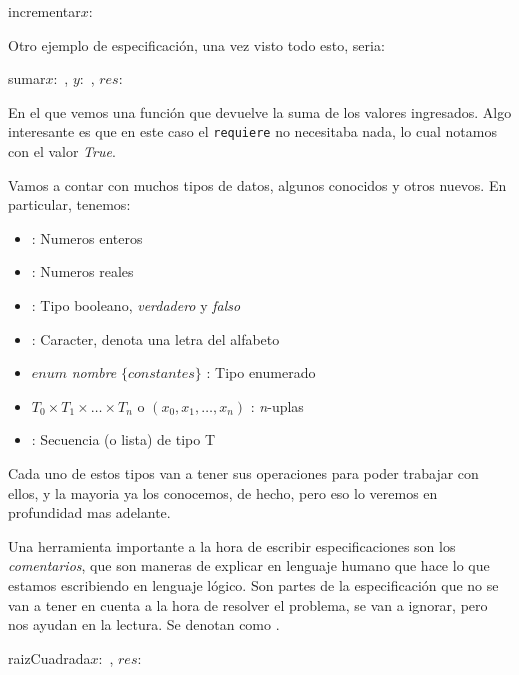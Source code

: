 \documentclass{article}
\begin{document}
\begin{proc}{incrementar}{\Inout $x:$ \ent}

	\requiere{\True}
	
\end{proc}

Otro ejemplo de especificación, una vez visto todo esto, seria:

\begin{proc}{sumar}{\In $x:$ \ent, \In $y:$ \ent, \Out $res:$ \ent}

	\requiere{\True}
	
\end{proc}

En el que vemos una función que devuelve la suma de los valores ingresados. Algo interesante es que en este caso el \texttt{requiere} no necesitaba nada, lo cual notamos con el valor \textit{True}.

Vamos a contar con muchos tipos de datos, algunos conocidos y otros nuevos. En particular, tenemos:

\begin{itemize}
	\item \ent : Numeros enteros
	\item \float : Numeros reales
	\item \bool : Tipo booleano, \textit{verdadero} y \textit{falso}
	\item \cha : Caracter, denota una letra del alfabeto
	\item $enum$ \textit{nombre} $\{ constantes \}$ : Tipo enumerado
	\item $T_{0} \times T_{1} \times \ldots \times T_{n}$ o $(x_{0}, x_{1}, \ldots , x_{n})$ : \textit{n}-uplas
	\item {} : Secuencia (o lista) de tipo T
\end{itemize}

Cada uno de estos tipos van a tener sus operaciones para poder trabajar con ellos, y la mayoria ya los conocemos, de hecho, pero eso lo veremos en profundidad mas adelante.

Una herramienta importante a la hora de escribir especificaciones son los \textit{comentarios}, que son maneras de explicar en lenguaje humano que hace lo que estamos escribiendo en lenguaje lógico. Son partes de la especificación que no se van a tener en cuenta a la hora de resolver el problema, se van a ignorar, pero nos ayudan en la lectura. Se denotan como .

\begin{proc}{raizCuadrada}{\In $x:$ \ent, \Out $res:$ \ent}

	
	

\end{proc}
\end{document}
